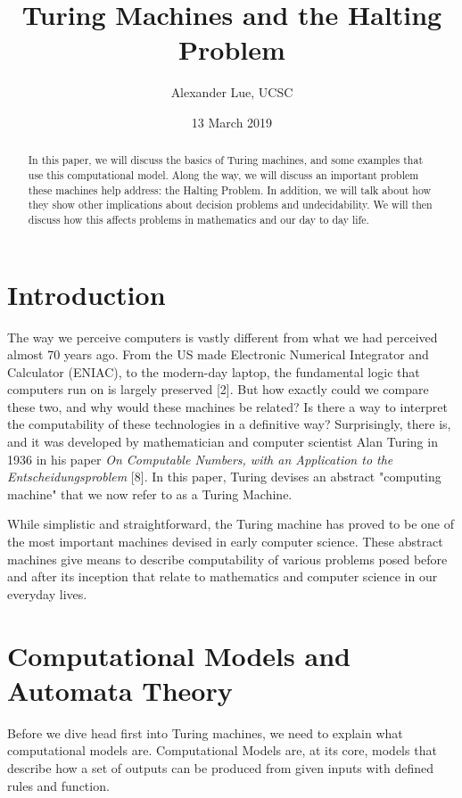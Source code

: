 \documentclass[11pt]{article}
\title{Turing Machines and the Halting Problem}
\author{Alexander Lue, UCSC}
\date{13 March 2019}
\begin{document}
\maketitle

\begin{abstract}
	In this paper, we will discuss the basics of Turing machines, and some examples that use this computational model. Along the way, we will discuss an important problem these machines help address: the Halting Problem. In addition, we will talk about how they show other implications about decision problems and undecidability. We will then discuss how this affects problems in mathematics and our day to day life.
\end{abstract}



\section{Introduction}

The way we perceive computers is vastly different from what we had perceived almost 70 years ago. From the US made Electronic Numerical Integrator and Calculator (ENIAC), to the modern-day laptop, the fundamental logic that computers run on is largely preserved [2]. But how exactly could we compare these two, and why would these machines be related? Is there a way to interpret the computability of these technologies in a definitive way? Surprisingly, there is, and it was developed by mathematician and computer scientist Alan Turing in 1936 in his paper \textit{On Computable Numbers, with an Application to the Entscheidungsproblem} [8]. In this paper, Turing devises an abstract "computing machine" that we now refer to as a Turing Machine.

While simplistic and straightforward, the Turing machine has proved to be one of the most important machines devised in early computer science. These abstract machines give means to describe computability of various problems posed before and after its inception that relate to mathematics and computer science in our everyday lives.



\section{Computational Models and Automata Theory}

Before we dive head first into Turing machines, we need to explain what computational models are. Computational Models are, at its core, models that describe how a set of outputs can be produced from given inputs with defined rules and function. 
\end{document}
